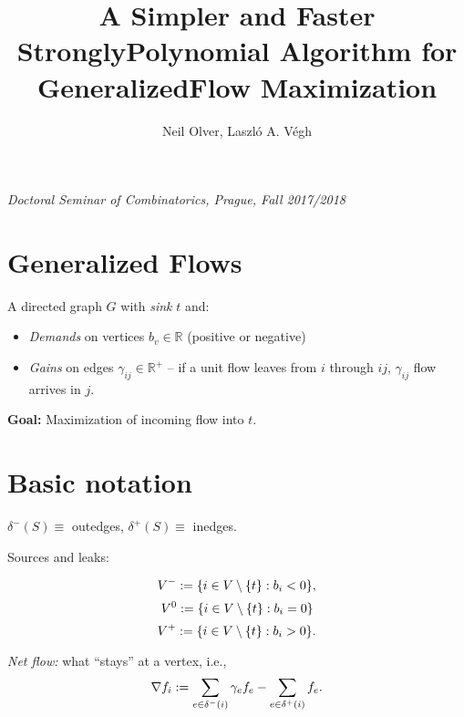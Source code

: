 \newcommand{\varX}{{\textcolor{OliveGreen}X}}
\newcommand{\varF}{{\textcolor{RedOrange}F}}
\newcommand{\varK}{{\textcolor{blue!70}K}}


\newcommand{\Vsymb}{Var}

\newcommand{\dir}[1]{{\bm{#1}}}


\long{}


\begin{multicols}{3}

\title{A Simpler and Faster Strongly}
\title{Polynomial Algorithm for Generalized}
\title{Flow Maximization}
\author{Neil Olver, Laszló A. Végh}
\centerline{\textit{Doctoral Seminar of Combinatorics, Prague, Fall 2017/2018}}

\section{Generalized Flows}
A directed graph $G$ with \emph{sink} $t$ and:
\begin{itemize}
\item \emph{Demands} on vertices $b_v ∈ ℝ$ (positive or negative)
\item \emph{Gains} on edges $γ_{ij} ∈ ℝ^+$ -- if a unit flow leaves
from $i$ through $ij$, $γ_{ij}$ flow arrives in $j$.
\end{itemize}

\textbf{Goal:} Maximization of incoming flow into $t$.


\section{Basic notation}

$δ^-(S) ≡ $ outedges, $δ^+(S) ≡$ inedges.

Sources and leaks:
	
\[V^- := \{ i \in V \setminus \{t\} : b_i < 0\},\]
\[V^0 := \{ i \in V \setminus \{t\} : b_i = 0\} \]
\[V^+ := \{ i \in V \setminus \{t\} : b_i > 0\}.\]

\emph{Net flow:} what ``stays'' at a vertex, i.e.,
\[ \nabla f_{i} := \sum_{e\in \delta^-(i)} \gamma_e f_e - \sum_{e\in \delta^+(i)} f_e. \]


\end{multicols}
